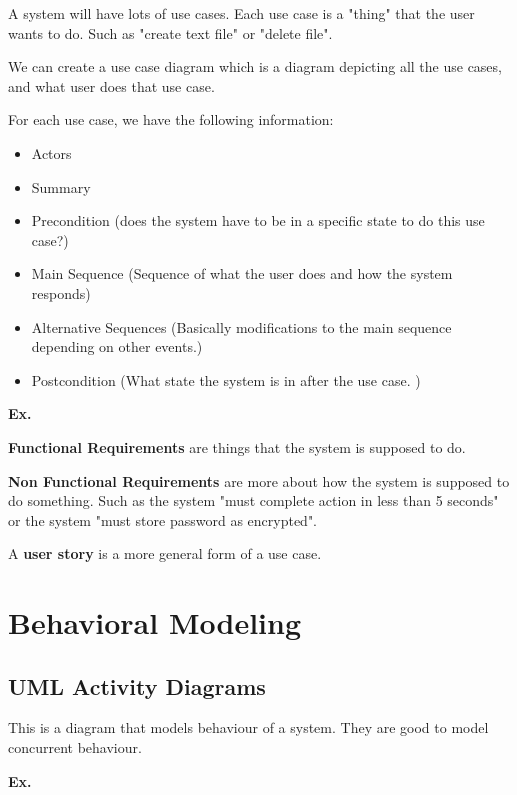 \documentclass[12pt,letterpaper]{article} \usepackage{amsmath} \usepackage{graphicx} \usepackage[margin=1in]{geometry} \usepackage{longtable}  \usepackage{amssymb}
\begin{document}
	A system will have lots of use cases. Each use case is a "thing" that the user wants to do. Such as "create text file" or "delete file".
	
	We can create a use case diagram which is a diagram depicting all the use cases, and what user does that use case. 
	
	For each use case, we have the following information:
	\begin{itemize}[noitemsep]
		\item Actors
		\item Summary
		\item Precondition (does the system have to be in a specific state to do this use case?)
		\item Main Sequence (Sequence of what the user does and how the system responds)
		\item Alternative Sequences (Basically modifications to the main sequence depending on other events.)
		\item Postcondition (What state the system is in after the use case. )
	\end{itemize}

	\begin{mdframed}
		\textbf{Ex. } 
	\end{mdframed}

	\textbf{Functional Requirements} are things that the system is supposed to do. 
	
	\textbf{Non Functional Requirements} are more about how the system is supposed to do something. Such as the system "must complete action in less than 5 seconds" or the system "must store password as encrypted".
	
	A \textbf{user story} is a more general form of a use case.
 	
	\section{Behavioral Modeling}
	
	\subsection{UML Activity Diagrams}
	This is a diagram that models behaviour of a system. They are good to model concurrent behaviour. 
	
	\begin{mdframed}
		\textbf{Ex. } 
	\end{mdframed}
	
\end{document}
